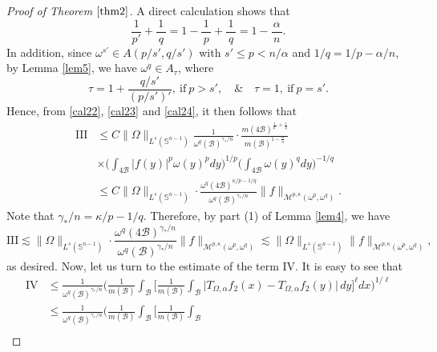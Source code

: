 \documentclass[preprint,10pt]{elsarticle}
\numberwithin{equation}{section}
\begin{document}
\begin{proof}[Proof of Theorem $\ref{thm2}$]
A direct calculation shows that
\begin{equation}\label{cal24}
\frac{1}{p'}+\frac{\,1\,}{q}=1-\frac{\,1\,}{p}+\frac{\,1\,}{q}=1-\frac{\alpha}{\,n\,}.
\end{equation}
In addition, since $\omega^{s'}\in A(p/{s'},q/{s'})$ with $s'\leq p<n/{\alpha}$ and $1/q=1/p-{\alpha}/n$, by Lemma \ref{lem5}, we have $\omega^q\in A_{\tau}$, where
\begin{equation}\label{samething}
\tau=1+\frac{q/{s'}}{(p/{s'})'}, ~\mbox{if}~ p>s',\quad\&\quad \tau=1, ~\mbox{if}~ p=s'.
\end{equation}
Hence, from \eqref{cal22}, \eqref{cal23} and \eqref{cal24}, it then follows that
\begin{equation*}
\begin{split}
\mathrm{III}&\leq C\|\Omega\|_{L^s(\mathbb{S}^{n-1})}
\frac{1}{\omega^q(\mathcal{B})^{{\gamma_*}/n}}\cdot\frac{m(4\mathcal{B})^{\frac{1}{p'}+\frac{1}{q}}}{m(\mathcal{B})^{1-\frac{\alpha}{n}}}\\
&\times\bigg(\int_{4\mathcal{B}}|f(y)|^p\omega(y)^pdy\bigg)^{1/p}\bigg(\int_{4\mathcal{B}}\omega(y)^{q}dy\bigg)^{-1/{q}}\\
&\leq C\|\Omega\|_{L^s(\mathbb{S}^{n-1})}\cdot
\frac{\omega^q(4\mathcal{B})^{\kappa/p-1/q}}{\omega^q(\mathcal{B})^{{\gamma_*}/n}}\|f\|_{\mathcal{M}^{p,\kappa}(\omega^p,\omega^q)}.
\end{split}
\end{equation*}
Note that ${\gamma_*}/n=\kappa/p-1/q$. Therefore, by part (1) of Lemma \ref{lem4}, we have
\begin{equation*}
\mathrm{III}\lesssim\|\Omega\|_{L^s(\mathbb{S}^{n-1})}\cdot
\frac{\omega^q(4\mathcal{B})^{{\gamma_*}/n}}{\omega^q(\mathcal{B})^{{\gamma_*}/n}}\|f\|_{\mathcal{M}^{p,\kappa}(\omega^p,\omega^q)}
\lesssim\|\Omega\|_{L^s(\mathbb{S}^{n-1})}\|f\|_{\mathcal{M}^{p,\kappa}(\omega^p,\omega^q)},
\end{equation*}
as desired. Now, let us turn to the estimate of the term IV. It is easy to see that
\begin{equation*}
\begin{split}
\mathrm{IV}
&\leq\frac{1}{\omega^q(\mathcal{B})^{{\gamma_*}/n}}\bigg(\frac{1}{m(\mathcal{B})}\int_{\mathcal{B}}
\bigg[\frac{1}{m(\mathcal{B})}\int_{\mathcal{B}}\big|T_{\Omega,\alpha}f_2(x)-T_{\Omega,\alpha}f_2(y)\big|\,dy\bigg]^{\ell}dx\bigg)^{1/{\ell}}\\
&\leq\frac{1}{\omega^q(\mathcal{B})^{{\gamma_*}/n}}\bigg(\frac{1}{m(\mathcal{B})}\int_{\mathcal{B}}\bigg[\frac{1}{m(\mathcal{B})}\int_{\mathcal{B}}\\

\end{split}
\end{equation*}
\end{proof}
\end{document}
